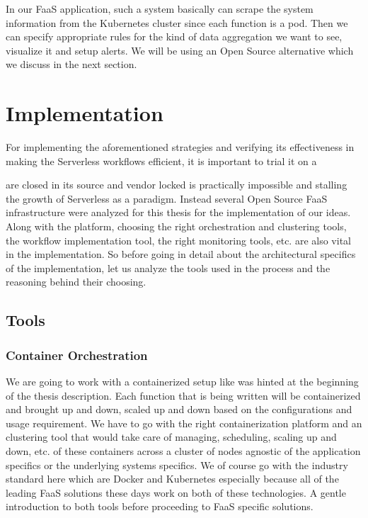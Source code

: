 \documentclass[12pt,titlepage]{article}
\begin{document}
In our FaaS application, such a system basically can scrape the system
information from the Kubernetes cluster since each function is a pod. Then we
can specify appropriate rules for the kind of data aggregation we want to see,
visualize it and setup alerts. We will be using an Open Source alternative
which we discuss in the next section.


\section{Implementation}
\label{sec:org9850f8f}
For implementing the aforementioned strategies and verifying its effectiveness
in making the Serverless workflows efficient, it is important to trial it on a

are closed in its source and vendor locked is practically impossible and
stalling the growth of Serverless as a paradigm. Instead several Open Source
FaaS infrastructure were analyzed for this thesis for the implementation of our
ideas. Along with the platform, choosing the right orchestration and clustering tools, the
workflow implementation tool, the right monitoring tools, etc. are also vital in
the implementation. So before going in detail about the architectural specifics
of the implementation, let us analyze the tools used in the process and the
reasoning behind their choosing.

\subsection{Tools}
\label{sec:org8c03889}
\subsubsection{Container Orchestration}
\label{sec:orgab56e9e}
We are going to work with a containerized setup like was hinted at the beginning
of the thesis description. Each function that is being written will be
containerized and brought up and down, scaled up and down based on the
configurations and usage requirement. We have to go with the right
containerization platform and an clustering tool that would take care of
managing, scheduling, scaling up and down, etc. of these containers across a
cluster of nodes agnostic of the application specifics or the underlying systems
specifics. We of course go with the industry standard here which are Docker and
Kubernetes especially because all of the leading FaaS solutions these days work
on both of these technologies. A gentle introduction to both tools before
proceeding to FaaS specific solutions.
\end{document}
